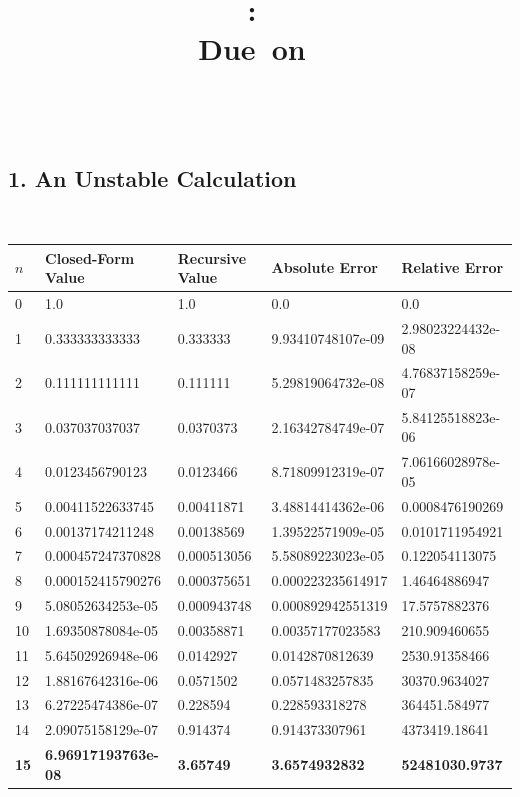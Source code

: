 \documentclass{article}
\title{\vspace{2in}\textmd{\textbf{\hmwkClass:\ \hmwkTitle}}\\\normalsize\vspace{0.1in}\small{Due\ on\ \hmwkDueDate}\\\vspace{0.1in}\large{\textit{\hmwkClassInstructor\ \hmwkClassTime}}\vspace{3in}}
\date{}
\author{\textbf{\hmwkAuthorName}}
\begin{document}
\begin{spacing}{1.1}

\newpage


\subsection{1. An Unstable Calculation}

\begin{table}[H]
	\label{table1}
	\centering
    \begin{tabular}{|l|l|l|l|l|}
	\hline
	
	\(n\) & Closed-Form Value & Recursive Value & Absolute Error & Relative Error \\

	\hline

    0 & 1.0 & 1.0 & 0.0 & 0.0 \\
    1 & 0.333333333333 & 0.333333 & 9.93410748107e-09 & 2.98023224432e-08 \\
    2 & 0.111111111111 & 0.111111 & 5.29819064732e-08 & 4.76837158259e-07 \\
    3 & 0.037037037037 & 0.0370373 & 2.16342784749e-07 & 5.84125518823e-06 \\
    4 & 0.0123456790123 & 0.0123466 & 8.71809912319e-07 & 7.06166028978e-05 \\
    5 & 0.00411522633745 & 0.00411871 & 3.48814414362e-06 & 0.0008476190269 \\
    6 & 0.00137174211248 & 0.00138569 & 1.39522571909e-05 & 0.0101711954921 \\
    7 & 0.000457247370828 & 0.000513056 & 5.58089223023e-05 & 0.122054113075 \\
    8 & 0.000152415790276 & 0.000375651 & 0.000223235614917 & 1.46464886947 \\
    9 & 5.08052634253e-05 & 0.000943748 & 0.000892942551319 & 17.5757882376 \\
    10 & 1.69350878084e-05 & 0.00358871 & 0.00357177023583 & 210.909460655 \\
    11 & 5.64502926948e-06 & 0.0142927 & 0.0142870812639 & 2530.91358466 \\
    12 & 1.88167642316e-06 & 0.0571502 & 0.0571483257835 & 30370.9634027 \\
    13 & 6.27225474386e-07 & 0.228594 & 0.228593318278 & 364451.584977 \\
    14 & 2.09075158129e-07 & 0.914374 & 0.914373307961 & 4373419.18641 \\
    \bf{15} & \bf{6.96917193763e-08} & \bf{3.65749} & \bf{3.6574932832} & \bf{52481030.9737} \\


\end{tabular}
\end{table}
\end{spacing}
\end{document}
